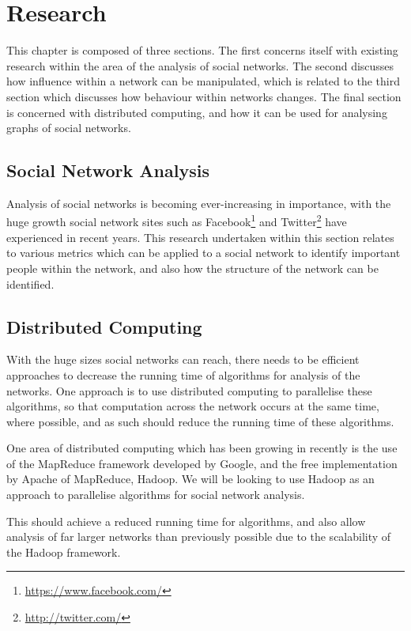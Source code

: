 \chapter{Research}
This chapter is composed of three sections. The first concerns itself with existing research within the area of the analysis of social networks. The second discusses how influence within a network can be manipulated, which is related to the third section which discusses how behaviour within networks changes. The final section is concerned with distributed computing, and how it can be used for analysing graphs of social networks.


\section{Social Network Analysis}
Analysis of social networks is becoming ever-increasing in importance, with the huge growth social network sites such as Facebook\footnote{\url{https://www.facebook.com/}} and Twitter\footnote{\url{http://twitter.com/}} have experienced in recent years. This research undertaken within this section relates to various metrics which can be applied to a social network to identify important people within the network, and also how the structure of the network can be identified.








\section{Distributed Computing}
With the huge sizes social networks can reach, there needs to be efficient approaches to decrease the running time of algorithms for analysis of the networks. One approach is to use distributed computing to parallelise these algorithms, so that computation across the network occurs at the same time, where possible, and as such should reduce the running time of these algorithms.

One area of distributed computing which has been growing in recently is the use of the MapReduce framework developed by Google, and the free implementation by Apache of MapReduce, Hadoop. We will be looking to use Hadoop as an approach to parallelise algorithms for social network analysis.

This should achieve a reduced running time for algorithms, and also allow analysis of far larger networks than previously possible due to the scalability of the Hadoop framework.



